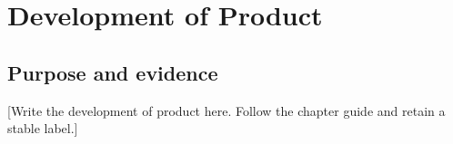 \chapter{Development of Product}
\label{chap:development_of_product}
\section{Purpose and evidence}
[Write the development of product here. Follow the chapter guide and retain a stable label.]
